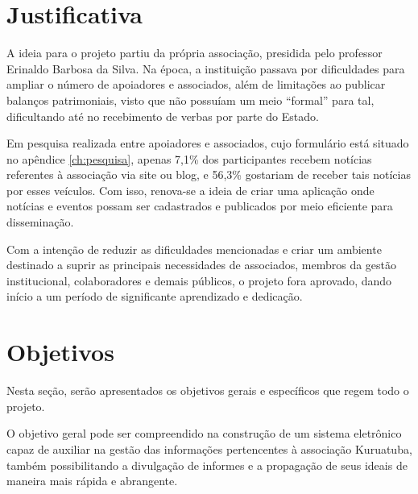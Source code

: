 \hspace{2.5cm}
\section{Justificativa}
\hspace{2.5cm}

A ideia para o projeto partiu da própria associação, presidida pelo professor Erinaldo Barbosa da Silva. Na época, a instituição passava por dificuldades para ampliar o número de apoiadores e associados, além de limitações ao publicar balanços patrimoniais, visto que não possuíam um meio ``formal'' para tal, dificultando até no recebimento de verbas por parte do Estado.

Em pesquisa realizada entre apoiadores e associados, cujo formulário está situado no apêndice \ref{ch:pesquisa}, apenas 7,1\% dos participantes recebem notícias referentes à associação via site ou blog, e 56,3\% gostariam de receber tais notícias por esses veículos. Com isso, renova-se a ideia de criar uma aplicação onde notícias e eventos possam ser cadastrados e publicados por meio eficiente para disseminação.

Com a intenção de reduzir as dificuldades mencionadas e criar um ambiente destinado a suprir as principais necessidades de associados, membros da gestão institucional, colaboradores e demais públicos, o projeto fora aprovado, dando início a um período de significante aprendizado e dedicação.

\hspace{2.5cm}
\section{Objetivos}
\hspace{2.5cm}

Nesta seção, serão apresentados os objetivos gerais e específicos que regem todo o projeto. 

O objetivo geral pode ser compreendido na construção de um sistema eletrônico capaz de auxiliar na gestão das informações pertencentes à associação Kuruatuba, também possibilitando a divulgação de informes e a propagação de seus ideais de maneira mais rápida e abrangente.

